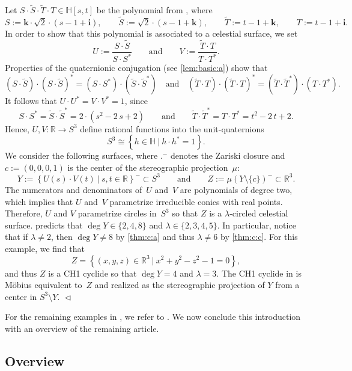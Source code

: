 \documentclass[11pt]{article}
\newcommand{\RL}[2]{\Cref{lem:#1}\ref{lem:#1:#2}}
\newcommand{\R}{\mathbb{R}}
\renewcommand{\H}{\mathbb{H}}
\newcommand{\tS}{\tilde{S}}
\newcommand{\tT}{\tilde{T}}
\newcommand{\qi}{\mathbf{i}}
\newcommand{\qk}{\mathbf{k}}
\renewcommand{\c}{\colon}
\newcommand{\set}[2]{\left\{#1 ~|~ #2\right\}}
\newcommand{\END}{\hfill $\vartriangleleft$}
\begin{document}
\begin{example}
\label{exm:CH1}
Let $S\cdot\tS\cdot\tT\cdot T\in\H[s,t]$ be the polynomial from , where
\[
S:=\qk\cdot\sqrt{2}\cdot(s-1+\qi),\qquad
\tS:=\sqrt{2}\cdot(s-1+\qk),\qquad
\tT:=t-1+\qk,\qquad
T:=t-1+\qi.
\]
In order to show that this polynomial is associated to a celestial surface, we set
\[
U:=\frac{S\cdot\tS}{S\cdot S^*}
\qquad\text{and}\qquad
V:=\frac{\tT\cdot T}{T\cdot T^*}.
\]
Properties of the quaternionic conjugation (see \RL{basic}{a}) show that
\[
(S\cdot\tS)\cdot (S\cdot\tS)^*=(S\cdot S^*)\cdot(\tS\cdot\tS^*)
\quad\text{and}\quad
(\tT\cdot T)\cdot (\tT\cdot T)^*=(\tT\cdot\tT^*)\cdot( T\cdot T^*).
\]
It follows that $U\cdot U^*=V\cdot V^*=1$, since
\[
S\cdot S^*=\tS\cdot\tS^*=2\cdot(s^2-2\,s+2)
\qquad\text{and}\qquad
\tT\cdot\tT^*= T\cdot T^*=t^2-2\,t+2.
\]
Hence,
$U,V\c\R\to S^3$ define rational functions into the
unit-quaternions
\[
S^3\cong\set{h\in\H}{h\cdot h^*=1}.
\]
We consider the following surfaces, where
$.^-$ denotes the Zariski closure and
$c:=(0,0,0,1)$ is the center of the stereographic projection~$\mu$:
\[
Y:=\set{U(s)\cdot V(t)}{s,t\in\R}^-\subset S^3
\qquad\text{and}\qquad
Z:=\mu(Y\setminus\{c\})^-\subset\R^3.
\]
The numerators and denominators of~$U$ and~$V$ are polynomials of degree two,
which implies that $U$ and~$V$ parametrize irreducible conics with real points.
Therefore, $U$ and $V$ parametrize circles in~$S^3$ so that $Z$ is a $\lambda$-circled celestial surface.
 predicts that $\deg Y\in\{2,4,8\}$ and $\lambda\in\{2,3,4,5\}$.
In particular, notice that if $\lambda\neq 2$, then $\deg Y\neq 8$ by \ref{thm:c:a}
and thus $\lambda\neq 6$ by \ref{thm:c:c}.
For this example, we find that
\[
Z=\set{(x,y,z)\in\R^3}{x^2+y^2-z^2-1=0},
\]
and thus $Z$ is a CH1 cyclide so that $\deg Y=4$ and $\lambda=3$.
The CH1 cyclide in  is M\"obius equivalent to~$Z$
and realized as the stereographic projection of $Y$ from a center in $S^3\setminus Y$.
\END
\end{example}

For the remaining examples in ,
we refer to \citep[Example~26]{2023trans}.
We now conclude this introduction with an overview of the remaining article.

\subsection{Overview}
\label{sec:overview}
\end{document}
